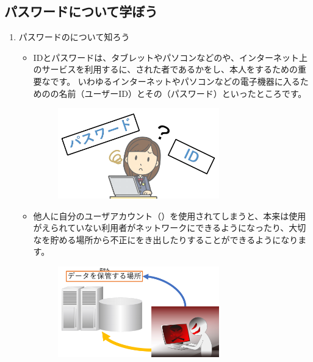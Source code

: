 \documentclass[a4paper,12pt]{jarticle}
\begin{document}
\subsection{パスワードについて学ぼう}
\begin{enumerate}
  \item
  パスワードのについて知ろう
      \begin{itemize}
      \item
          IDとパスワードは、タブレットやパソコンなどのや、インターネット上のサービスを利用するに、された者であるかをし、本人をするための重要なです。 いわゆるインターネットやパソコンなどの電子機器に入るためのの名前（ユーザーID）とその（パスワード）といったところです。
          \begin{figure}[h]
            \centering
            \begin{minipage}{5.228cm}
              {\upshape
                \includegraphics[width=7.000cm]{pswd_image_imp6.pdf}
                }
            \end{minipage}
          \end{figure}
          \item
              他人に自分のユーザアカウント（）を使用されてしまうと、本来は使用がえられていない利用者がネットワークにできるようになったり、大切なを貯める場所から不正にをき出したりすることができるようになります。
          \begin{figure}[h]
            \centering
              \begin{minipage}{5.228cm}
                {\upshape
                  \includegraphics[width=7.000cm]{pswd_image_imp5.pdf}
}
\end{minipage}
\end{figure}
\end{itemize}
\end{enumerate}
\end{document}
